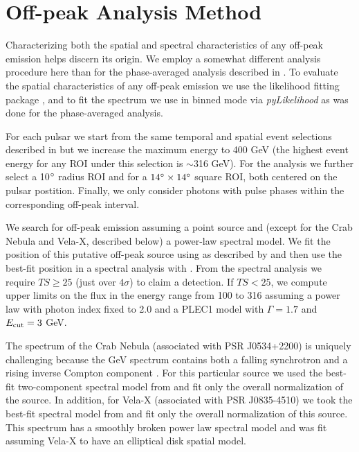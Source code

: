 \section{Off-peak Analysis Method}

Characterizing both the spatial and spectral
characteristics of any off-peak emission helps discern its origin.
We employ a somewhat different analysis procedure here than
for the phase-averaged analysis described in \citep{abdo_2013a_second-fermi}.  
To evaluate the spatial characteristics of
any off-peak emission we use the likelihood fitting package \pointlike
\citep[detailed in][]{lande_2012_search-spatially}, and
to fit the spectrum we use \gtlike in binned mode via {\it pyLikelihood} as was done for the
phase-averaged analysis.

For each pulsar we start from
the same temporal and spatial event selections described in 
\citep{abdo_2013a_second-fermi} but we increase the maximum energy to 400 GeV (the
highest event energy for any ROI under this selection is $\sim$316 GeV).
For the \pointlike analysis we further select a 10$^\circ$ radius ROI
and for \gtlike a $14^\circ\times14^\circ$ square ROI, both centered
on the pulsar postition.  Finally, we only consider photons with 
pulse phases within the corresponding off-peak interval.

We search for off-peak emission
assuming a point source and (except for the Crab Nebula and Vela-X, described below) 
a power-law spectral model.  We fit the position of this
putative off-peak source using \pointlike as described by \citet{nolan_2012_fermi-large}
and then use the best-fit position in a spectral analysis with \gtlike.
From the spectral analysis we require $TS\geq25$ (just over $4\sigma$)
to claim a detection.  If $TS<25$, we compute upper limits on the flux 
in the energy range from 100 \mev to 316 \gev
assuming
a power law with photon index fixed to 2.0 and a PLEC1 model with
$\Gamma=1.7$ and $E_{\rm cut}=3$ GeV.

The spectrum of the Crab Nebula (associated with PSR J0534+2200) is
uniquely challenging because the GeV spectrum contains both a falling
synchrotron and a rising inverse Compton component \citep{abdo_2010a_fermi-large}.
For this particular source we used the best-fit two-component spectral
model from \cite{buehler_2012a_gamma-ray-activity} and fit only the overall
normalization of the source. 
In addition, for Vela-X (associated with PSR J0835-4510) we took the
best-fit spectral model from \cite{grondin_2013a_vela-x-pulsar} and fit only the overall
normalization of this source. This spectrum has a smoothly broken power
law spectral model and was fit assuming Vela-X to have an elliptical
disk spatial model.

